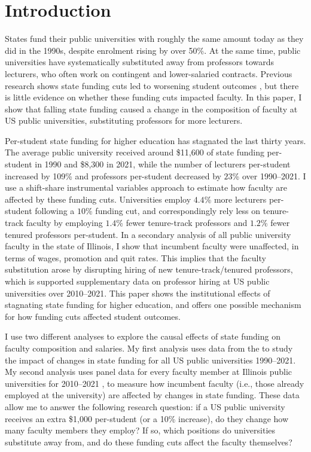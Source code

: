 \section{Introduction}
\label{sec:intro}
States fund their public universities with roughly the same amount today as they did in the 1990s, despite enrolment rising by over 50\%.
At the same time, public universities have systematically substituted away from professors towards lecturers, who often work on contingent and lower-salaried contracts.
Previous research shows state funding cuts led to worsening student outcomes \citep{NBERw23736,NBERw27885}, but there is little evidence on whether these funding cuts impacted faculty.
In this paper, I show that falling state funding caused a change in the composition of faculty at US public universities, substituting professors for more lecturers.

Per-student state funding for higher education has stagnated the last thirty years.
The average public university received around \$11,600 of state funding per-student in 1990 and \$8,300 in 2021, while the number of lecturers per-student increased by 109\% and professors per-student decreased by $23$\% over 1990--2021.
I use a shift-share instrumental variables approach to estimate how faculty are affected by these funding cuts.
Universities employ $4.4$\% more lecturers per-student following a $10$\% funding cut, and correspondingly rely less on tenure-track faculty by employing $1.4$\% fewer tenure-track professors and $1.2$\% fewer tenured professors per-student.
In a secondary analysis of all public university faculty in the state of Illinois, I show that incumbent faculty were unaffected, in terms of wages, promotion and quit rates.
This implies that the faculty substitution arose by disrupting hiring of new tenure-track/tenured professors, which is supported supplementary data on professor hiring at US public universities over 2010--2021.
This paper shows the institutional effects of stagnating state funding for higher education, and offers one possible mechanism for how funding cuts affected student outcomes.

I use two different analyses to explore the causal effects of state funding on faculty composition and salaries.
My first analysis uses data from the \citet[IPEDS]{ipeds} to study the impact of changes in state funding for all US public universities 1990--2021.
My second analysis uses panel data for every faculty member at Illinois public universities for 2010--2021 \citet[IBHED]{ibhed}, to measure how incumbent faculty (i.e., those already employed at the university) are affected by changes in state funding.
These data allow me to answer the following research question: if a US public university receives an extra \$1,000 per-student (or a 10\% increase), do they change how many faculty members they employ?
If so, which positions do universities substitute away from, and do these funding cuts affect the faculty themselves?

